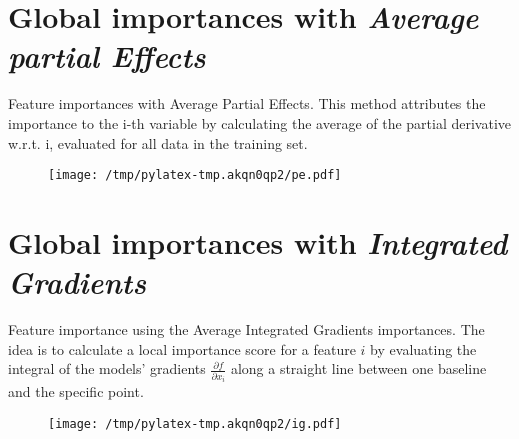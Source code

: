 \documentclass{article}%
\begin{document}
\section*{Global importances with \textit{Average partial Effects}}%
\label{sec:GlobalimportanceswithtextitAveragepartialEffects}%

                Feature importances with Average Partial Effects. This method
                attributes the importance to the i-th variable by calculating
                the average of the partial derivative w.r.t. i, evaluated for
                all data in the training set.

                \vfill%


\begin{figure}[H]%
\centering%
\texttt{[image: /tmp/pylatex-tmp.akqn0qp2/pe.pdf]}%
\end{figure}

%
\vfill \pagebreak

%

                \chead{}
                \rhead{\today, \currenttime}
                
                \lfoot{}
                \cfoot{}
                \rfoot{\thepage\ | \pageref{LastPage}}
\section*{Global importances with \textit{Integrated Gradients}}%
\label{sec:GlobalimportanceswithtextitIntegratedGradients}%

                Feature importance using the Average Integrated Gradients
                importances. The idea is to calculate a local
                importance score for a feature $i$ by evaluating the integral of
                the models' gradients $\frac{\partial f}{\partial x_i}$ along a
                straight line between one baseline and the specific point.
            
                \vfill%


\begin{figure}[H]%
\centering%
\texttt{[image: /tmp/pylatex-tmp.akqn0qp2/ig.pdf]}%
\end{figure}

%
\vfill \pagebreak

%

                \chead{}
                \rhead{\today, \currenttime}
                
\end{document}
